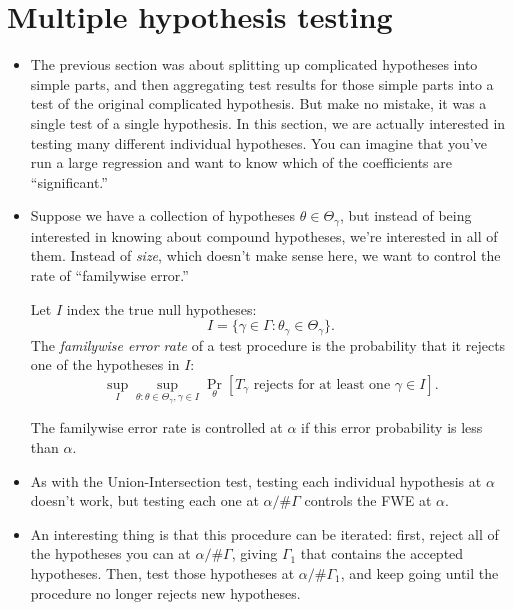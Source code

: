 \section{Multiple hypothesis testing}

\begin{itemize}[leftmargin=0pt]

\item The previous section was about splitting up complicated
  hypotheses into simple parts, and then aggregating test results for
  those simple parts into a test of the original complicated
  hypothesis. But make no mistake, it was a single test of a single
  hypothesis. In this section, we are actually interested in testing
  many different individual hypotheses. You can imagine that you've
  run a large regression and want to know which of the coefficients
  are ``significant.''

\item Suppose we have a collection of hypotheses $\theta \in
  \Theta_\gamma$, but instead of being interested in knowing about
  compound hypotheses, we're interested in all of them. Instead of
  \emph{size}, which doesn't make sense here, we want to control the
  rate of ``familywise error.''
  \begin{defn}
    Let $I$ index the true null hypotheses:
    \begin{equation*}
      I = \{\gamma \in \Gamma : \theta_\gamma \in \Theta_\gamma\}.
    \end{equation*}
    The \emph{familywise error rate} of a test procedure is the
    probability that it rejects one of the hypotheses in $I$:
    \begin{equation*}
      \sup_I \sup_{\theta: \theta \in \Theta_\gamma, \gamma \in I}
      \Pr_\theta[T_\gamma \text{ rejects for at least one } \gamma \in I].
    \end{equation*}
  \end{defn}

  The familywise error rate is controlled at $\alpha$ if this error
  probability is less than $\alpha$.

\item As with the Union-Intersection test, testing each individual
  hypothesis at $\alpha$ doesn't work, but testing each one at
  $\alpha / \# \Gamma$ controls the FWE at $\alpha$.

\item An interesting thing is that this procedure can be iterated:
  first, reject all of the hypotheses you can at $\alpha/\#\Gamma$,
  giving $\Gamma_1$ that contains the accepted hypotheses.  Then, test
  those hypotheses at $\alpha/\#\Gamma_1$, and keep going until the
  procedure no longer rejects new hypotheses.


\end{itemize}
